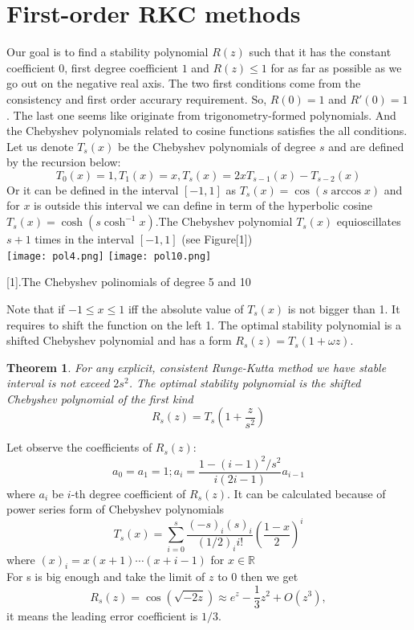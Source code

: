 \documentclass{article}
\theoremstyle{theorem}
\newtheorem{theorem}{Theorem}
\theoremstyle{definition}
\begin{document}
	\section{First-order RKC methods}
Our goal is to find a stability polynomial $R(z)$ such that it has the constant coefficient $0$, first degree coefficient $1$ and $R(z) \le 1$ for as far as possible as we go out on the negative real axis. The two first conditions come from the consistency and first order accurary requirement. So, $R(0)=1$ and $R'(0)=1$. The last one seems like originate from trigonometry-formed polynomials. And the Chebyshev polynomials related to cosine functions satisfies the all conditions.\\
Let us denote $T_s(x)$ be the Chebyshev polynomials of degree $s$ and are defined by the recursion below: $$T_0(x)=1 , T_1(x)=x , T_s(x)=2xT_{s-1}(x)-T_{s-2}(x)$$
Or it can be defined in the interval $[-1,1]$ as $T_s(x)=\cos(s \arccos x) $ and for $x$ is outside this interval we can define in term of the hyperbolic cosine $T_s(x)=\cosh(s \cosh^{-1} x)$.The Chebyshev polynomial $T_s(x)$ equioscillates $s+1$ times in the
interval $[-1,1]$ (see Figure[1])\\
\texttt{[image: pol4.png]}
\texttt{[image: pol10.png]}	

\begin{center}
	\figurename[1]{.The Chebyshev polinomials of degree 5 and 10}
\end{center}
Note that if $-1 \le x \le 1$ iff the absolute value of $T_s(x)$ is not bigger than 1. It requires to shift the function on the left 1. The optimal stability polynomial is a shifted Chebyshev polynomial and has a form $R_s(z)=T_s(1+\omega z)$.
\begin{theorem}
	For any explicit, consistent Runge-Kutta method we have stable interval is not exceed $2s^2$. The optimal stability polynomial is the shifted Chebyshev polynomial of the first kind
	$$R_s(z)=T_s\left(1+\frac{z}{s^2}\right) $$
\end{theorem}

Let observe the coefficients of $R_s(z)$:
$$a_0=a_1=1; a_i=\frac{1-(i-1)^2/s^2}{i(2i-1)}a_{i-1}$$ where $a_i$ be $i$-th degree coefficient of $R_s(z)$. It can be calculated because of power series form of Chebyshev polynomials $$T_s(x)= \sum_{i=0}^{s} \frac{(-s)_i(s)_i}{(1/2)_ii!} \left(\frac{1-x}{2}\right)^i$$ where $(x)_i=x(x+1) \cdots (x+i-1)$ for $x \in \mathbb{R}$\\
For s is big enough and take the limit of $z$ to $0$ then we get 
 $$R_s(z)= \cos (\sqrt{-2z}) \approx e^z-\frac{1}{3}z^2+O (z^3),$$ it means the leading error coefficient is $1/3$.
\end{document}
